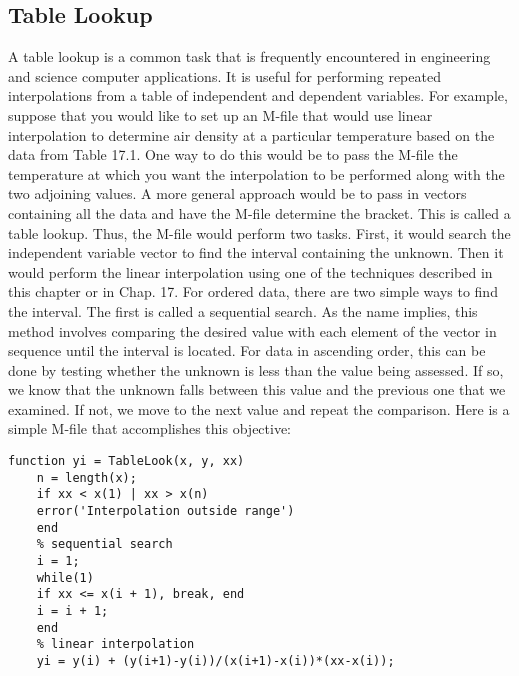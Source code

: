 \documentclass[../main.tex]{subfiles}
\begin{document}
\subsection{Table Lookup}

A table lookup is a common task that is frequently encountered in engineering and science
computer applications. It is useful for performing repeated interpolations from a table of
independent and dependent variables. For example, suppose that you would like to set up
an M-file that would use linear interpolation to determine air density at a particular temperature based on the data from Table 17.1. One way to do this would be to pass the M-file
the temperature at which you want the interpolation to be performed along with the two adjoining values. A more general approach would be to pass in vectors containing all the data
and have the M-file determine the bracket. This is called a table lookup.
Thus, the M-file would perform two tasks. First, it would search the independent variable vector to find the interval containing the unknown. Then it would perform the linear
interpolation using one of the techniques described in this chapter or in Chap. 17.
For ordered data, there are two simple ways to find the interval. The first is called a
sequential search. As the name implies, this method involves comparing the desired value
with each element of the vector in sequence until the interval is located. For data in ascending order, this can be done by testing whether the unknown is less than the value being
assessed. If so, we know that the unknown falls between this value and the previous one
that we examined. If not, we move to the next value and repeat the comparison. Here is a
simple M-file that accomplishes this objective:
\begin{lstlisting}[numbers=none]
    function yi = TableLook(x, y, xx)
    n = length(x);
    if xx < x(1) | xx > x(n)
    error('Interpolation outside range')
    end
    % sequential search
    i = 1;
    while(1)
    if xx <= x(i + 1), break, end
    i = i + 1;
    end
    % linear interpolation
    yi = y(i) + (y(i+1)-y(i))/(x(i+1)-x(i))*(xx-x(i));
\end{lstlisting}
\end{document}
